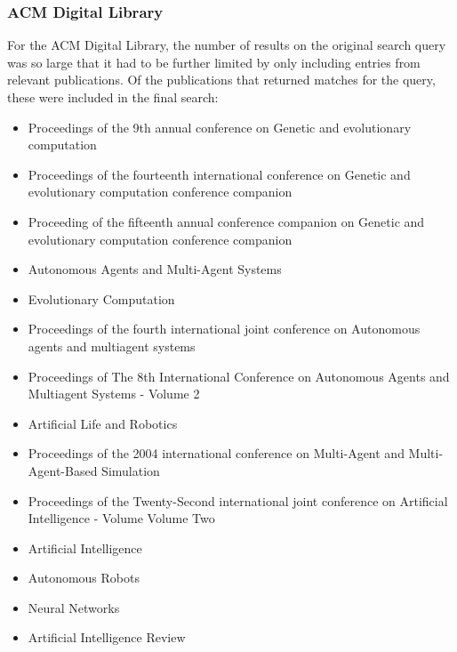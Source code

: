 \documentclass[a4paper]{book}
\begin{document}
				\subsubsection{ACM Digital Library}
				For the ACM Digital Library, the number of results on the original search query
				was so large that it had to be further limited by only including entries from 
				relevant publications. Of the publications that returned matches for the query,
				these were included in the final search:

				\begin{itemize}

				\item{Proceedings of the 9th annual conference on Genetic and evolutionary computation}
				\item{Proceedings of the fourteenth international conference on Genetic and evolutionary computation conference companion}
				\item{Proceeding of the fifteenth annual conference companion on Genetic and evolutionary computation conference companion}
				\item{Autonomous Agents and Multi-Agent Systems}
				\item{Evolutionary Computation}
				\item{Proceedings of the fourth international joint conference on Autonomous agents and multiagent systems}
				\item{Proceedings of The 8th International Conference on Autonomous Agents and Multiagent Systems - Volume 2 }
				\item{Artificial Life and Robotics}
				\item{Proceedings of the 2004 international conference on Multi-Agent and Multi-Agent-Based Simulation }
				\item{Proceedings of the Twenty-Second international joint conference on Artificial Intelligence - Volume Volume Two}
				\item{Artificial Intelligence}
				\item{Autonomous Robots}
				\item{Neural Networks}
				\item{Artificial Intelligence Review }
				\end{itemize}
\end{document}
